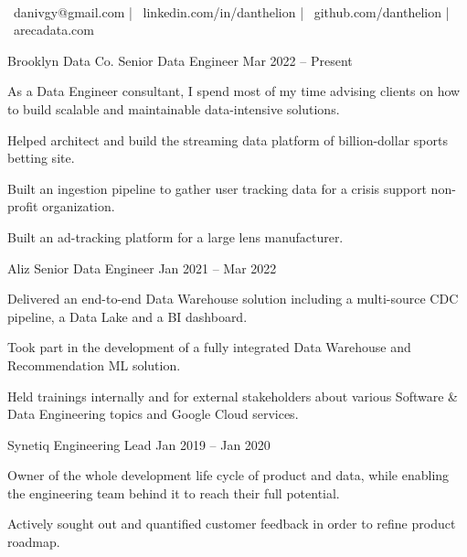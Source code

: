 \documentclass[]{awesome-cv}
\begin{document}
    
\begin{center}
	  \\
	\vspace{2mm}
	{\faEnvelope\ danivgy@gmail.com} | {\faLink\ linkedin.com/in/danthelion} | {\faLink\ github.com/danthelion} | {\faLink\ arecadata.com}
\end{center}
\begin{cventries}
	\cventry
	{Brooklyn Data Co.}
	{Senior Data Engineer}
	{Mar 2022 – Present}
	{}
	{\begin{cvitems}
		\item {As a Data Engineer consultant, I spend most of my time advising clients on how to build scalable and maintainable data-intensive solutions.}
		\item {Helped architect and build the streaming data platform of billion-dollar sports betting site.}
		\item {Built an ingestion pipeline to gather user tracking data for a crisis support non-profit organization.}
		\item {Built an ad-tracking platform for a large lens manufacturer.}
		\end{cvitems}}
	\cventry
	{Aliz}
	{Senior Data Engineer}
	{Jan 2021 – Mar 2022}
	{}
	{\begin{cvitems}
		\item {Delivered an end-to-end Data Warehouse solution including a multi-source CDC pipeline, a Data Lake and a BI dashboard.}
		\item {Took part in the development of a fully integrated Data Warehouse and Recommendation ML solution.}
		\item {Held trainings internally and for external stakeholders about various Software & Data Engineering topics and Google Cloud services.}
		\end{cvitems}}
	\cventry
	{Synetiq}
	{Engineering Lead}
	{Jan 2019 – Jan 2020}
	{}
	{\begin{cvitems}
		\item {Owner of the whole development life cycle of product and data, while enabling the engineering team behind it to reach their full potential.}
		\item {Actively sought out and quantified customer feedback in order to refine product roadmap.}

\end{cvitems}}
\end{cventries}
\end{document}
